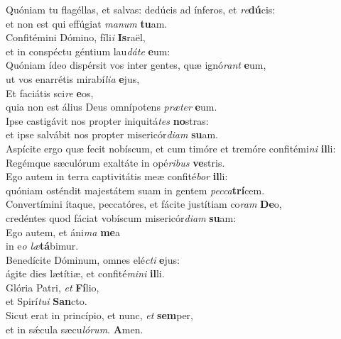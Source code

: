 \evenverse Quóniam tu flagéllas, et salvas: dedúcis ad ínferos, et \textit{re}\textbf{dú}cis:~\*\\
\evenverse et non est qui effúgiat \textit{ma}\textit{num} \textbf{tu}am.\\
\oddverse Confitémini Dómino, fíli\textit{i} \textbf{Is}raël,~\*\\
\oddverse et in conspéctu géntium lau\textit{dá}\textit{te} \textbf{e}um:\\
\evenverse Quóniam ídeo dispérsit vos inter gentes, quæ ignó\textit{rant} \textbf{e}um,~\*\\
\evenverse ut vos enarrétis mirabí\textit{li}\textit{a} \textbf{e}jus,\\
\oddverse Et faciátis sci\textit{re} \textbf{e}os,~\*\\
\oddverse quia non est álius Deus omnípotens \textit{præ}\textit{ter} \textbf{e}um.\\
\evenverse Ipse castigávit nos propter iniquitá\textit{tes} \textbf{no}stras:~\*\\
\evenverse et ipse salvábit nos propter misericór\textit{di}\textit{am} \textbf{su}am.\\
\oddverse Aspícite ergo quæ fecit nobíscum, et cum timóre et tremóre confitémi\textit{ni} \textbf{il}li:~\*\\
\oddverse Regémque sæculórum exaltáte in opé\textit{ri}\textit{bus} \textbf{ve}stris.\\
\evenverse Ego autem in terra captivitátis meæ confité\textit{bor} \textbf{il}li:~\*\\
\evenverse quóniam osténdit majestátem suam in gentem \textit{pec}\textit{ca}\textbf{trí}cem.\\
\oddverse Convertímini ítaque, peccatóres, et fácite justítiam co\textit{ram} \textbf{De}o,~\*\\
\oddverse credéntes quod fáciat vobíscum misericór\textit{di}\textit{am} \textbf{su}am:\\
\evenverse Ego autem, et áni\textit{ma} \textbf{me}a~\*\\
\evenverse in e\textit{o} \textit{læ}\textbf{tá}bimur.\\
\oddverse Benedícite Dóminum, omnes elé\textit{cti} \textbf{e}jus:~\*\\
\oddverse ágite dies lætítiæ, et confité\textit{mi}\textit{ni} \textbf{il}li.\\
\evenverse Glória Patri, \textit{et} \textbf{Fí}lio,~\*\\
\evenverse et Spirí\textit{tu}\textit{i} \textbf{San}cto.\\
\oddverse Sicut erat in princípio, et nunc, \textit{et} \textbf{sem}per,~\*\\
\oddverse et in sǽcula sæcu\textit{ló}\textit{rum}. \textbf{A}men.\\
